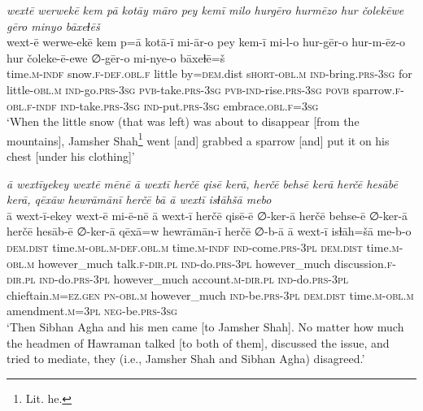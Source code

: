 \ea \label{DP.36}
\textit{wextē werwekē kem pā kotāy māro pey kemī milo hurgēro hurmēzo hur čolekēwe gēro minyo bāxeɫēš} \\ 
\gll wext-ē werwe-ekē kem p=ā kotā-ī mi-ār-o pey kem-ī mi-l-o hur-gēr-o hur-m-ēz-o hur čoleke-ē-ewe ∅-gēr-o mi-nye-o bāxeɫē=š \\ 
 time\textsc{.m}\textsc{-indf} snow\textsc{\textsc{.f}}\textsc{-def}\textsc{.obl}\textsc{\textsc{.f}} little by\textsc{=dem}.dist s\textsc{hort}\textsc{-obl}\textsc{.m} \textsc{ind-}bring\textsc{.prs}\textsc{-3sg} for little\textsc{-obl}\textsc{.m} \textsc{ind-}go\textsc{.prs}\textsc{-3sg} \textsc{pvb-}take\textsc{.prs}\textsc{-3sg} \textsc{pvb-}\textsc{ind-}rise\textsc{.prs}\textsc{-3sg} \textsc{povb} sparrow\textsc{\textsc{.f}}\textsc{-obl}\textsc{\textsc{.f}}\textsc{-indf} \textsc{ind-}take\textsc{.prs}\textsc{-3sg} \textsc{ind-}put\textsc{.prs}\textsc{-3sg} embrace\textsc{.obl}\textsc{\textsc{.f}}\textsc{=3sg} \\ 
\glt `When the little snow (that was left) was about to disappear [from the mountains], Jamsher Shah\footnote{Lit. he.} went [and] grabbed a sparrow [and] put it on his chest [under his clothing]'
\z 
 
\ea \label{DP.46}
\textit{ā wextīyekey wextē mēnē ā wextī herčē qisē kerā, herčē behsē kerā herčē hesābē kerā, qēxāw hewrāmānī herčē bā ā wextī isɫāhšā mebo} \\ 
\gll ā wext-ī-ekey wext-ē mi-ē-nē ā wext-ī herčē qisē-ē ∅-ker-ā herčē behse-ē ∅-ker-ā herčē hesāb-ē ∅-ker-ā qēxā=w hewrāmān-ī herčē ∅-b-ā ā wext-ī isɫāh=šā me-b-o \\ 
 \textsc{dem.dist} time\textsc{.m}\textsc{-obl}\textsc{.m}\textsc{-def}\textsc{.obl}\textsc{.m} time\textsc{.m}\textsc{-indf} \textsc{ind-}come\textsc{.prs}\textsc{-3pl} \textsc{dem.dist} time\textsc{.m}\textsc{-obl}\textsc{.m} however\_much talk\textsc{\textsc{.f}}\textsc{-dir}\textsc{.pl} \textsc{ind-}do\textsc{.prs}\textsc{-3pl} however\_much discussion\textsc{\textsc{.f}}\textsc{-dir}\textsc{.pl} \textsc{ind-}do\textsc{.prs}\textsc{-3pl} however\_much account\textsc{.m}\textsc{-dir}\textsc{.pl} \textsc{ind-}do\textsc{.prs}\textsc{-3pl} chieftain\textsc{.m}\textsc{=ez}\textsc{.gen} \textsc{pn}\textsc{-obl}\textsc{.m} however\_much \textsc{ind-}be\textsc{.prs}\textsc{-3pl} \textsc{dem.dist} time\textsc{.m}\textsc{-obl}\textsc{.m} amendment\textsc{.m}\textsc{=3pl} \textsc{neg-}be\textsc{.prs}\textsc{-3sg} \\ 
\glt `Then Sibhan Agha and his men came [to Jamsher Shah]. No matter how much the headmen of Hawraman talked [to both of them], discussed the issue, and tried to mediate, they (i.e., Jamsher Shah and Sibhan Agha) disagreed.'
\z 
 
